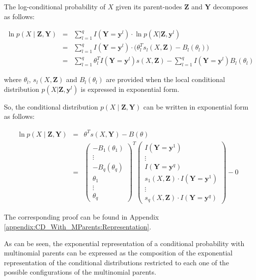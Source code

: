 \documentclass[11pt, oneside]{article}   	%
\newcommand{\bm}{\mathbf}
\numberwithin{figure}{section}
\numberwithin{equation}{section}
\numberwithin{table}{section}
\theoremstyle{definition}
\begin{document}
The log-conditional probability of $X$ given its parent-nodes $\bm Z$ and $\mathbf{Y}$ decomposes as  follows:

\begin{eqnarray*}
\ln p(X \mid \bm Z, \bm Y) &=&  \sum_{l=1}^q I(\mathbf{Y} =\mathbf{y}^l) \cdot \ln p(X | \bm Z, \mathbf{y}^l) \\
&=& \sum_{l=1}^q I(\mathbf{Y} =\mathbf{y}^l) \cdot \Big(  \theta_{l}^T s_l(X, \bm Z)  -  B_l(\theta_{l}) \Big)\\
&=& \sum_{l=1}^q \theta_{l}^T  I(\mathbf{Y} =\mathbf{y}^l) s(X, \bm Z) - \sum_{l=1}^q I(\mathbf{Y} =\mathbf{y}^l) B_l(\theta_{l})
\end{eqnarray*}

\noindent where $\theta_l$, $s_l(X,\bm Z)$ and $B_l(\theta_l)$ are provided when the local conditional distribution $p(X | \bm Z, \mathbf{y}^l)$ is expressed in exponential form. 

So, the conditional distribution $p(X \mid \bm Z, \bm Y)$ can be written in exponential form as follows: 

\begin{eqnarray}
\label{Equation:CD_With_MParents:Representation}
\ln p(X \mid \bm Z, \bm Y)  &=& \theta^T s(X,\mathbf{Y}) - B(\theta) \nonumber \\
&=&
\begin{pmatrix}
- B_1(\theta_{1}) \\
\vdots \\
- B_q(\theta_{q}) \\
\theta_{1} \\
\vdots \\
\theta_{q}
\end{pmatrix}^T
\begin{pmatrix}
I(\mathbf{Y} =\mathbf{y}^1) \\
\vdots \\
I(\mathbf{Y} =\mathbf{y}^q) \\
s_1(X, \bm Z) \cdot I(\mathbf{Y} =\mathbf{y}^1) \\
\vdots \\
s_q(X, \bm Z) \cdot I(\mathbf{Y} =\mathbf{y}^q)
\end{pmatrix}
- 0 
\end{eqnarray}

The corresponding proof can be found in Appendix \ref{appendix:CD_With_MParents:Representation}.

As can be seen, the exponential representation of a conditional probability with multinomial parents can be expressed as the composition of the exponential representation of the conditional distributions restricted to each one of the possible configurations of the multinomial parents. 
\end{document}
